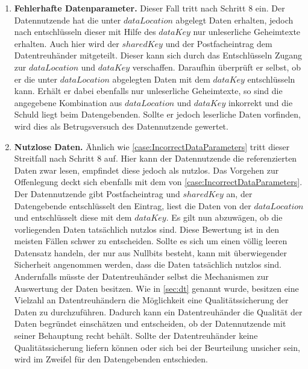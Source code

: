 \documentclass[11pt,a4paper]{scrreprt}
\begin{document}
\begin{enumerate}
    
    \item \textbf{Fehlerhafte Datenparameter.}\label{case:IncorrectDataParameters}
    Dieser Fall tritt nach Schritt 8 ein. Der Datennutzende hat die unter $dataLocation$ abgelegt Daten erhalten, jedoch nach entschlüsseln dieser mit Hilfe des $dataKey$ nur unleserliche Geheimtexte erhalten. Auch hier wird der $sharedKey$ und der Postfacheintrag dem Datentreuhänder mitgeteilt. Dieser kann sich durch das Entschlüsseln Zugang zur $dataLocation$ und $dataKey$ verschaffen. Daraufhin überprüft er selbst, ob er die unter $dataLocation$ abgelegten Daten mit dem $dataKey$ entschlüsseln kann. Erhält er dabei ebenfalls nur unleserliche Geheimtexte, so sind die angegebene Kombination aus $dataLocation$ und $dataKey$ inkorrekt und die Schuld liegt beim Datengebenden. Sollte er jedoch leserliche Daten vorfinden, wird dies als Betrugsversuch des Datennutzende gewertet.

    \item \textbf{Nutzlose Daten.}\label{case:UselessData}
    Ähnlich wie \ref{case:IncorrectDataParameters} tritt dieser Streitfall nach Schritt 8 auf. Hier kann der Datennutzende die referenzierten Daten zwar lesen, empfindet diese jedoch als nutzlos. Das Vorgehen zur Offenlegung deckt sich ebenfalls mit dem von \ref{case:IncorrectDataParameters}. Der Datennutzende gibt Postfacheintrag und $sharedKey$ an, der Datengebende entschlüsselt den Eintrag, liest die Daten von der $dataLocation$ und entschlüsselt diese mit dem $dataKey$. Es gilt nun abzuwägen, ob die vorliegenden Daten tatsächlich nutzlos sind. Diese Bewertung ist in den meisten Fällen schwer zu entscheiden. Sollte es sich um einen völlig leeren Datensatz handeln, der nur aus Nullbits besteht, kann mit überwiegender Sicherheit angenommen werden, dass die Daten tatsächlich nutzlos sind. Andernfalls müsste der Datentreuhänder selbst die Mechanismen zur Auswertung der Daten besitzen. Wie in \ref{sec:dt} genannt wurde, besitzen eine Vielzahl an Datentreuhändern die Möglichkeit eine Qualitätssicherung der Daten zu durchzuführen. Dadurch kann ein Datentreuhänder die Qualität der Daten begründet einschätzen und entscheiden, ob der Datennutzende mit seiner Behauptung recht behält. Sollte der Datentreuhänder keine Qualitätssicherung liefern können oder sich bei der Beurteilung unsicher sein, wird im Zweifel für den Datengebenden entschieden.


\end{enumerate}
\end{document}

